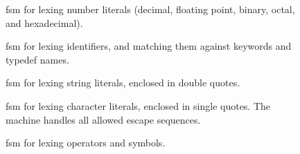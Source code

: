 \documentclass[../00-main.tex]{subfiles}
\begin{document}
\begin{figure}[h]
  \centering
  \caption{\Acrlong{fsm} for lexing number literals (decimal, floating point, binary, octal, and hexadecimal).}
  \label{app:fig:lexing numbers fsm} %
\end{figure}

\begin{figure}[h]
  \centering
  \caption{\Acrlong{fsm} for lexing identifiers, and matching them against keywords and typedef names.}
  \label{app:fig:lexing identifiers fsm} %
\end{figure}

\begin{figure}[h]
  \centering
  \caption{\Acrlong{fsm} for lexing string literals, enclosed in double quotes.}
  \label{app:fig:lexing strings fsm} %
\end{figure}

\begin{figure}[h]
  \centering
  \caption{\Acrlong{fsm} for lexing character literals, enclosed in single quotes. The machine handles all allowed escape sequences.}
  \label{app:fig:lexing chars fsm} %
\end{figure}

\begin{figure}[h]
  \centering
  \caption{\Acrlong{fsm} for lexing operators and symbols.}
  \label{app:fig:lexing operators fsm} %
\end{figure}
\end{document}
